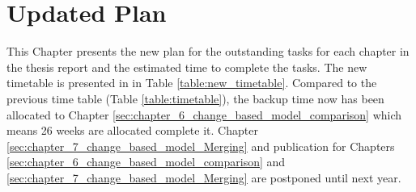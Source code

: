 \documentclass[12pt, a4paper]{report} \usepackage[titletoc]{appendix}
\begin{document}
\chapter{Updated Plan}
\label{ch:new_plan}
This Chapter presents the new plan for the outstanding tasks for each chapter in the thesis report and the estimated time to complete the tasks. The new timetable is presented in in Table \ref{table:new_timetable}. Compared to the previous time table (Table \ref{table:timetable}), the backup time now has been allocated to Chapter \ref{sec:chapter_6_change_based_model_comparison} which means 26 weeks are allocated complete it. Chapter \ref{sec:chapter_7_change_based_model_Merging} and publication for Chapters \ref{sec:chapter_6_change_based_model_comparison} and \ref{sec:chapter_7_change_based_model_Merging} are postponed until next year. 
\end{document}
